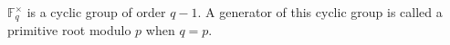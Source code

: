 $\mathbb{F}_q^\times$ is a cyclic group of order $q-1$. A generator of this cyclic group is called a primitive root modulo $p$ when $q=p$.